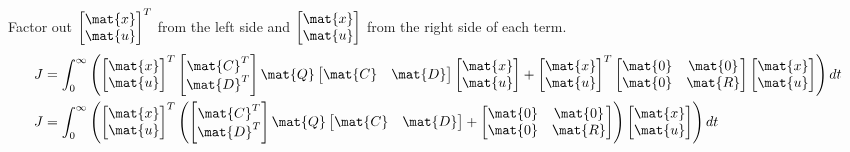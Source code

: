 Factor out $\begin{bmatrix}\mat{x} \\ \mat{u}\end{bmatrix}^T$ from the left side
and $\begin{bmatrix}\mat{x} \\ \mat{u}\end{bmatrix}$ from the right side of each
term.
\begin{align*}
  J &= \int_0^\infty \left(
    \begin{bmatrix}
      \mat{x} \\
      \mat{u}
    \end{bmatrix}^T
    \begin{bmatrix}
      \mat{C}^T \\
      \mat{D}^T
    \end{bmatrix}
    \mat{Q}
    \begin{bmatrix}
      \mat{C} &
      \mat{D}
    \end{bmatrix}
    \begin{bmatrix}
      \mat{x} \\
      \mat{u}
    \end{bmatrix} +
    \begin{bmatrix}
      \mat{x} \\
      \mat{u}
    \end{bmatrix}^T
    \begin{bmatrix}
      \mat{0} & \mat{0} \\
      \mat{0} & \mat{R}
    \end{bmatrix}
    \begin{bmatrix}
      \mat{x} \\
      \mat{u}
    \end{bmatrix}
    \right) dt \\
  J &= \int_0^\infty \left(
    \begin{bmatrix}
      \mat{x} \\
      \mat{u}
    \end{bmatrix}^T
    \left(
    \begin{bmatrix}
      \mat{C}^T \\
      \mat{D}^T
    \end{bmatrix}
    \mat{Q}
    \begin{bmatrix}
      \mat{C} &
      \mat{D}
    \end{bmatrix} +
    \begin{bmatrix}
      \mat{0} & \mat{0} \\
      \mat{0} & \mat{R}
    \end{bmatrix}
    \right)
    \begin{bmatrix}
      \mat{x} \\
      \mat{u}
    \end{bmatrix}
    \right) dt
\end{align*}

